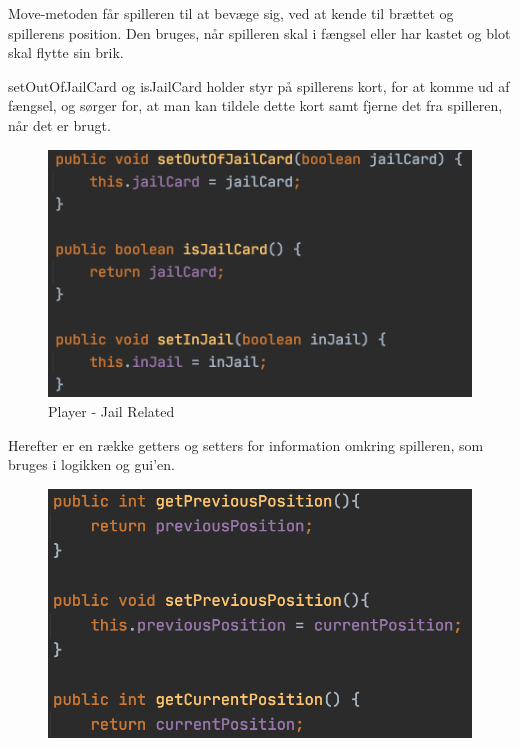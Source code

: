 Move-metoden får spilleren til at bevæge sig, ved at kende til brættet og spillerens position. Den bruges, når spilleren skal i fængsel eller har kastet og blot skal flytte sin brik.

setOutOfJailCard og isJailCard holder styr på spillerens kort, for at komme ud af fængsel, og sørger for, at man kan tildele dette kort samt fjerne det fra spilleren, når det er brugt.
\begin{figure}[H]
    \centering
    \includegraphics[width=\textwidth]{sources/7_implementering/Player JailRelated.png}
    \caption{Player - Jail Related }
    \label{fig:PlayerJail}
\end{figure}

Herefter er en række getters og setters for information omkring spilleren, som bruges i logikken og gui'en.
\begin{figure}[H]
    \centering
    \includegraphics[width=\textwidth]{sources/7_implementering/Player Position.png}
    \caption{}
    \label{fig:}
\end{figure}